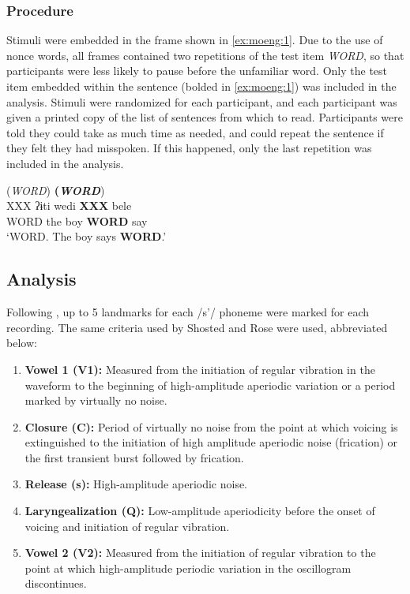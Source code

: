 \documentclass[output=paper
,newtxmath
,modfonts
,nonflat]{langsci/langscibook}
\begin{document}
\subsubsection{Procedure}\label{sec:moeng:5.1.2}

Stimuli were embedded in the frame shown in \ref{ex:moeng:1}. Due to the use of nonce words, all frames contained two repetitions of the test item \textit{WORD}, so that participants were less likely to pause before the unfamiliar word. Only the test item embedded within the sentence (bolded in \ref{ex:moeng:1}) was included in the analysis. Stimuli were randomized for each participant, and each participant was given a printed copy of the list of sentences from which to read. Participants were told they could take as much time as needed, and could repeat the sentence if they felt they had misspoken. If this happened, only the last repetition was included in the analysis.

\ea
\glll (\textit{WORD})           \textbf{(\textit{WORD}})   \\
XXX    ʔɨti  wedi    \textbf{XXX}    bele\\
WORD  the  boy    \textbf{WORD}  say\\
\glt ‘WORD. The boy says \textbf{WORD}.’
\z

\subsection{Analysis}\label{sec:moeng:5.2}

Following \citet{shosted2011affricating}, up to 5 landmarks for each /s’/ phoneme were marked for each recording. The same criteria used by Shosted and Rose were used, abbreviated below:

\begin{enumerate}
	\item {\textbf{Vowel 1 (V1):} Measured from the initiation of regular vibration in the waveform to the beginning of high-amplitude aperiodic variation or a period marked by virtually no noise.}
\item {\textbf{Closure (C):} Period of virtually no noise from the point at which voicing is extinguished to the initiation of high amplitude aperiodic noise (frication) or the first transient burst followed by frication.}
\item {\textbf{Release (s):} High-amplitude aperiodic noise.}
\item {\textbf{Laryngealization (Q):} Low-amplitude aperiodicity before the onset of voicing and initiation of regular vibration.}
\item {\textbf{Vowel 2 (V2):} Measured from the initiation of regular vibration to the point at which high-amplitude periodic variation in the oscillogram discontinues.}
\end{enumerate}
\end{document}
